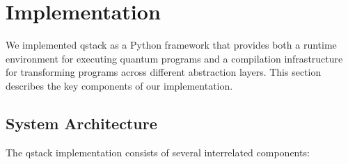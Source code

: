 \section{Implementation}\label{sec:implementation}

We implemented qstack as a Python framework that provides both a runtime environment for executing quantum programs and a compilation infrastructure for transforming programs across different abstraction layers. This section describes the key components of our implementation.

\subsection{System Architecture}

The qstack implementation consists of several interrelated components:

